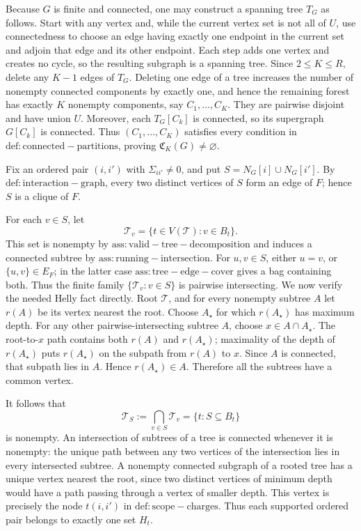 Because \(G\) is finite and connected, one may construct a spanning tree \(T_G\) as follows.  Start with any vertex and, while the current vertex set is not all of \(U\), use connectedness to choose an edge having exactly one endpoint in the current set and adjoin that edge and its other endpoint.  Each step adds one vertex and creates no cycle, so the resulting subgraph is a spanning tree.  Since \(2\le K\le R\), delete any \(K-1\) edges of \(T_G\).  Deleting one edge of a tree increases the number of nonempty connected components by exactly one, and hence the remaining forest has exactly \(K\) nonempty components, say \(C_1,\ldots,C_K\).  They are pairwise disjoint and have union \(U\).  Moreover, each \(T_G[C_k]\) is connected, so its supergraph \(G[C_k]\) is connected.  Thus \((C_1,\ldots,C_K)\) satisfies every condition in \(\mathrm{def:connected-partitions}\), proving \(\mathfrak C_K(G)\ne\varnothing\).

Fix an ordered pair \((i,i')\) with \(\Sigma_{ii'}\ne0\), and put \(S=N_G[i]\cup N_G[i']\).  By \(\mathrm{def:interaction-graph}\), every two distinct vertices of \(S\) form an edge of \(F\); hence \(S\) is a clique of \(F\).

For each \(v\in S\), let
\[
  \mathcal T_v=\{t\in V(\mathcal T):v\in B_t\}.
\]
This set is nonempty by \(\mathrm{ass:valid-tree-decomposition}\) and induces a connected subtree by \(\mathrm{ass:running-intersection}\).  For \(u,v\in S\), either \(u=v\), or \(\{u,v\}\in E_F\); in the latter case \(\mathrm{ass:tree-edge-cover}\) gives a bag containing both.  Thus the finite family \(\{\mathcal T_v:v\in S\}\) is pairwise intersecting.  We now verify the needed Helly fact directly.  Root \(\mathcal T\), and for every nonempty subtree \(A\) let \(r(A)\) be its vertex nearest the root.  Choose \(A_\star\) for which \(r(A_\star)\) has maximum depth.  For any other pairwise-intersecting subtree \(A\), choose \(x\in A\cap A_\star\).  The root-to-\(x\) path contains both \(r(A)\) and \(r(A_\star)\); maximality of the depth of \(r(A_\star)\) puts \(r(A_\star)\) on the subpath from \(r(A)\) to \(x\).  Since \(A\) is connected, that subpath lies in \(A\).  Hence \(r(A_\star)\in A\).  Therefore all the subtrees have a common vertex.

It follows that
\[
  \mathcal T_S:=\bigcap_{v\in S}\mathcal T_v
  =\{t:S\subseteq B_t\}
\]
is nonempty.  An intersection of subtrees of a tree is connected whenever it is nonempty: the unique path between any two vertices of the intersection lies in every intersected subtree.  A nonempty connected subgraph of a rooted tree has a unique vertex nearest the root, since two distinct vertices of minimum depth would have a path passing through a vertex of smaller depth.  This vertex is precisely the node \(t(i,i')\) in \(\mathrm{def:scope-charges}\).  Thus each supported ordered pair belongs to exactly one set \(H_t\).

